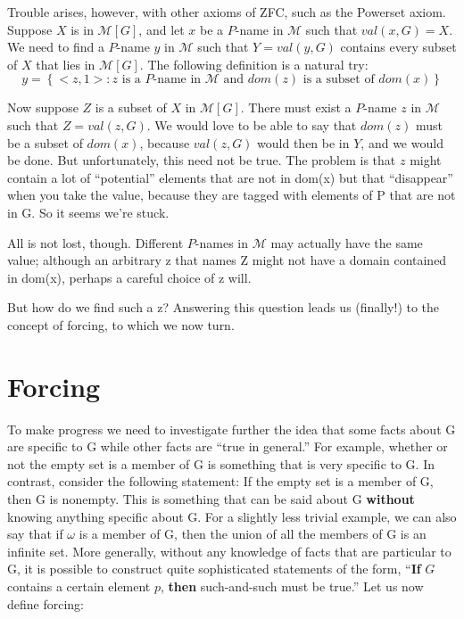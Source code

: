 \documentclass[10pt]{article}
\begin{document}
Trouble arises, however, with other axioms of ZFC, such as the Powerset axiom. Suppose $X$ is in $\mathcal{M}[G]$, and let $x$ be a $P$-name in $\mathcal{M}$ such that $val(x,G) = X$. We need to find a $P$-name $y$ in $\mathcal{M}$ such that $Y = val(y,G)$ contains every subset of $X$ that lies in $\mathcal{M}[G]$. The following definition is a natural try:
$$y = \left\{<z,1> : z\text{ is a }P\text{-name in }\mathcal{M}\text{ and }dom(z)\text{ is a subset of }dom(x)\right\}$$

Now suppose $Z$ is a subset of $X$ in $\mathcal{M}[G]$. There must exist a $P$-name $z$ in $\mathcal M$ such that $Z = val(z,G)$. We would love to be able to say that $dom(z)$ must be a subset of $dom(x)$, because $val(z,G)$ would then be in $Y$, and we would be done. But unfortunately, this need not be true. The problem is that $z$ might contain a lot of ``potential'' elements that are not in dom(x) but that ``disappear'' when you take the value, because they are tagged with elements of P that are not in G. So it seems we're stuck.

All is not lost, though. Different $P$-names in $\mathcal{M}$ may actually have the same value; although an arbitrary z that names Z might not have a domain contained in dom(x), perhaps a careful choice of z will.

But how do we find such a z? Answering this question leads us (finally!) to the concept of forcing, to which we now turn.


\section{Forcing}

To make progress we need to investigate further the idea that some facts about G are specific to G while other facts are ``true in general.'' For example, whether or not the empty set is a member of G is something that is very specific to G. In contrast, consider the following statement: If the empty set is a member of G, then G is nonempty. This is something that can be said about G \textbf{without} knowing anything specific about G. For a slightly less trivial example, we can also say that if $\omega$ is a member of G, then the union of all the members of G is an infinite set. More generally, without any knowledge of facts that are particular to G, it is possible to construct quite sophisticated statements of the form, ``\textbf{If} $G$ contains a certain element $p$, \textbf{then} such-and-such must be true.'' Let us now define forcing:
\end{document}
